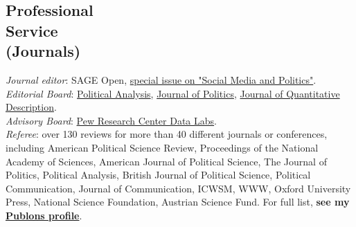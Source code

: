 \documentclass[margin,line,11pt]{resume}
\newcommand{\nl}{\vspace{0.10in}\\}
\begin{document}
\begin{resume}

    
   
    


\section{\mysidestyle Professional\\Service\\(Journals)}

\emph{Journal editor}: SAGE Open, \href{https://journals.sagepub.com/topic/sgo-subjects/3468/sgo}{special issue on "Social Media and Politics"}.\nl
\emph{Editorial Board}: \href{https://www.cambridge.org/core/journals/political-analysis/information/editorial-board}{Political Analysis}, \href{https://www.journals.uchicago.edu/journals/jop/board}{Journal of Politics}, \href{https://journalqd.org/editorialboard}{Journal of Quantitative Description}.\nl
\emph{Advisory Board}: \href{https://www.pewresearch.org/methods/about-data-labs/}{Pew Research Center Data Labs}.\nl
\emph{Referee}: over 130 reviews for more than 40 different journals or conferences, including American Political Science Review, Proceedings of the National Academy of Sciences, American Journal of Political Science, The Journal of Politics, Political Analysis, British Journal of Political Science, Political Communication, Journal of Communication, ICWSM, WWW, Oxford University Press, National Science Foundation, Austrian Science Fund. For full list, \textbf{see my \href{https://publons.com/author/1291880/pablo-barbera}{Publons profile}}.


\end{resume}
\end{document}
